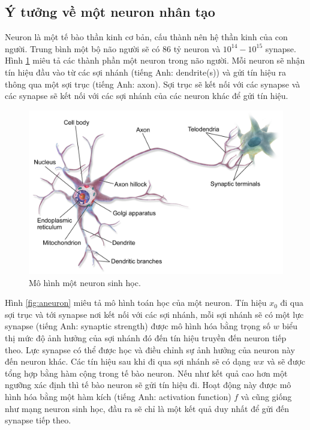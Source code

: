 \subsection{Ý tưởng về một neuron nhân tạo}
Neuron\cite{Suzana:2009} là một tế bào thần kinh cơ bản, cấu thành nên hệ thần kinh của con người. Trung bình một bộ não người sẽ có $86$ tỷ neuron và $10^{14} - 10^{15}$ synapse. Hình \ref{fig:neuron} miêu tả các thành phần một neuron trong não người. Mỗi neuron sẽ nhận tín hiệu đầu vào từ các sợi nhánh (tiếng Anh: dendrite(s)) và gửi tín hiệu ra thông qua một sợi trục (tiếng Anh: axon). Sợi trục sẽ kết nối với các synapse và các synapse sẽ kết nối với các sợi nhánh của các neuron khác để gửi tín hiệu.
\begin{figure}[ht!]
	\centerline{\includegraphics[scale=0.1]{images/neuron.png}}
  	\caption{Mô hình một neuron sinh học.}
  	\label{fig:neuron}
\end{figure}
Hình \ref{fig:aneuron} miêu tả mô hình toán học của một neuron. Tín hiệu $x_0$ đi qua sợi trục và tới synapse nơi kết nối với các sợi nhánh, mỗi sợi nhánh sẽ có một lực synapse (tiếng Anh: synaptic strength) được mô hình hóa bằng trọng số $w$ biểu thị mức độ ảnh hưởng của sợi nhánh đó đến tín hiệu truyền đến neuron tiếp theo. Lực synapse có thể được học và điều chỉnh sự ảnh hưởng của neuron này đến neuron khác. Các tín hiệu sau khi đi qua sợi nhánh sẽ có dạng $wx$ và sẽ được tổng hợp bằng hàm cộng trong tế bào neuron. Nếu như kết quả cao hơn một ngưỡng xác định thì tế bào neuron sẽ gửi tín hiệu đi. Hoạt động này được mô hình hóa bằng một hàm kích (tiếng Anh: activation function) $f$ và cũng giống như mạng neuron sinh học, đầu ra sẽ chỉ là một kết quả duy nhất để gửi đến synapse tiếp theo.
